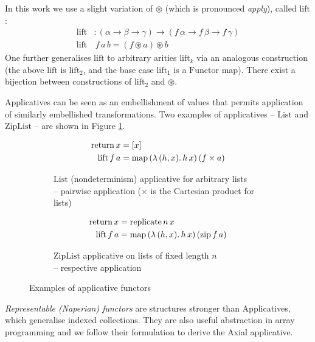 In this work we use a slight variation of $\circledast$ (which is pronounced \textit{apply}), called $\mathrm{lift}$:
\begin{align*}
\mathrm{lift}& : (\alpha \to \beta \to \gamma) \to (f\,\alpha \to f\,\beta \to f\,\gamma) \\ 
\mathrm{lift}&\,f\,a\,b = (f \circledast a) \circledast b
\end{align*}
One further generalises $\mathrm{lift}$ to arbitrary arities $\mathrm{lift}_k$ via an analogous construction (the above $\mathrm{lift}$ is $\mathrm{lift}_2$, and the base case $\mathrm{lift}_1$ is a $\mathrm{Functor}$ map). There exist a bijection between constructions of $\mathrm{lift}_2$ and $\circledast$.

Applicatives can be seen as an embellishment of values that permits application of similarly embellished transformations. Two examples of applicatives -- $\mathrm{List}$ and $\mathrm{ZipList}$ -- are shown in Figure \ref{fig:applicatives}.
%
\begin{figure}
\centering
\begin{subfigure}{.5\textwidth}
  \centering
  \begin{align*}
\mathrm{return}\,x &= [x] \\
\mathrm{lift}\,f\,a &= \mathrm{map}\,(\lambda\,(h, x) \ldotp h\,x)\,(f \times a)
  \end{align*}
  \caption{$\mathrm{List}$ (nondeterminism) applicative for arbitrary lists \\ -- pairwise application ($\times$ is the Cartesian product for lists)}
\end{subfigure}%
\begin{subfigure}{.5\textwidth}
  \centering
  \begin{align*}
\mathrm{return}\,x &= \mathrm{replicate}\,n\,x \\
\mathrm{lift}\,f\,a &= \mathrm{map}\,(\lambda\,(h, x) \ldotp h\,x)\,(\mathrm{zip}\,f\,a)
  \end{align*}
  \caption{$\mathrm{ZipList}$ applicative on lists of fixed length $n$ \\ -- respective application}
\end{subfigure}
\caption{Examples of applicative functors}
\label{fig:applicatives}
\end{figure}

\textit{Representable (Naperian) functors} are structures stronger than Applicatives, which generalise indexed collections. They are also useful abstraction in array programming \textcite{gibbons2016aplicative} and we follow their formulation to derive the Axial applicative.

